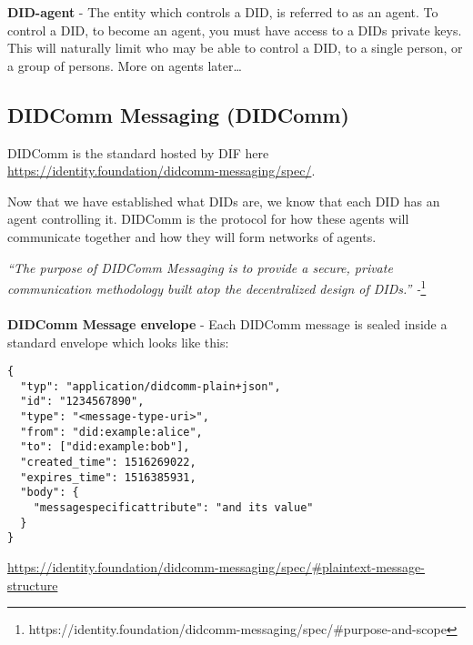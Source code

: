 \textbf{DID-agent} - The entity which controls a DID, is referred to as an agent. To control
a DID, to become an agent, you must have access to a DIDs private keys.
This will naturally limit who may be able to control a DID, to a single
person, or a group of persons. More on agents later\ldots{}




\pagebreak




\hypertarget{didcomm-messaging-didcomm}{%
\subsection{DIDComm Messaging
(DIDComm)}\label{didcomm-messaging-didcomm}}

DIDComm is the standard hosted by DIF here \url{https://identity.foundation/didcomm-messaging/spec/}.

Now that we have established what DIDs are, we know that each DID has an
agent controlling it. DIDComm is the protocol for how these agents will
communicate together and how they will form networks of agents.

\emph{``The purpose of DIDComm Messaging is to provide a secure, private
communication methodology built atop the decentralized design of DIDs.''
-}\footnote{https://identity.foundation/didcomm-messaging/spec/\#purpose-and-scope}

\paragraph{}

\textbf{DIDComm Message envelope} - Each DIDComm message is sealed inside a standard envelope which looks
like this:

\begin{lstlisting}
{
  "typ": "application/didcomm-plain+json",
  "id": "1234567890",
  "type": "<message-type-uri>",
  "from": "did:example:alice",
  "to": ["did:example:bob"],
  "created_time": 1516269022,
  "expires_time": 1516385931,
  "body": {
    "messagespecificattribute": "and its value"
  }
} 
\end{lstlisting}

\url{https://identity.foundation/didcomm-messaging/spec/\#plaintext-message-structure}


